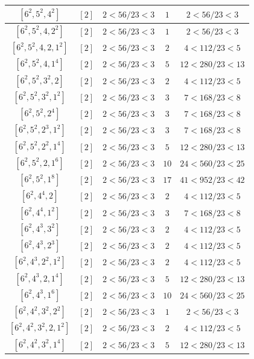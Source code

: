 \documentclass{article}%
\begin{document}
\begin{center}
\begin{longtable}{||c|c|c|c|c||}
$[6^{2}, 5^{2}, 4^{2}]$ & $[2]$ & $2 < 56/23 < 3$ & $1$ & $2 < 56/23 < 3$ \\ \hline 
$[6^{2}, 5^{2}, 4, 2^{2}]$ & $[2]$ & $2 < 56/23 < 3$ & $1$ & $2 < 56/23 < 3$ \\ \hline 
$[6^{2}, 5^{2}, 4, 2, 1^{2}]$ & $[2]$ & $2 < 56/23 < 3$ & $2$ & $4 < 112/23 < 5$ \\ \hline 
$[6^{2}, 5^{2}, 4, 1^{4}]$ & $[2]$ & $2 < 56/23 < 3$ & $5$ & $12 < 280/23 < 13$ \\ \hline 
$[6^{2}, 5^{2}, 3^{2}, 2]$ & $[2]$ & $2 < 56/23 < 3$ & $2$ & $4 < 112/23 < 5$ \\ \hline 
$[6^{2}, 5^{2}, 3^{2}, 1^{2}]$ & $[2]$ & $2 < 56/23 < 3$ & $3$ & $7 < 168/23 < 8$ \\ \hline 
$[6^{2}, 5^{2}, 2^{4}]$ & $[2]$ & $2 < 56/23 < 3$ & $3$ & $7 < 168/23 < 8$ \\ \hline 
$[6^{2}, 5^{2}, 2^{3}, 1^{2}]$ & $[2]$ & $2 < 56/23 < 3$ & $3$ & $7 < 168/23 < 8$ \\ \hline 
$[6^{2}, 5^{2}, 2^{2}, 1^{4}]$ & $[2]$ & $2 < 56/23 < 3$ & $5$ & $12 < 280/23 < 13$ \\ \hline 
$[6^{2}, 5^{2}, 2, 1^{6}]$ & $[2]$ & $2 < 56/23 < 3$ & $10$ & $24 < 560/23 < 25$ \\ \hline 
$[6^{2}, 5^{2}, 1^{8}]$ & $[2]$ & $2 < 56/23 < 3$ & $17$ & $41 < 952/23 < 42$ \\ \hline 
$[6^{2}, 4^{4}, 2]$ & $[2]$ & $2 < 56/23 < 3$ & $2$ & $4 < 112/23 < 5$ \\ \hline 
$[6^{2}, 4^{4}, 1^{2}]$ & $[2]$ & $2 < 56/23 < 3$ & $3$ & $7 < 168/23 < 8$ \\ \hline 
$[6^{2}, 4^{3}, 3^{2}]$ & $[2]$ & $2 < 56/23 < 3$ & $2$ & $4 < 112/23 < 5$ \\ \hline 
$[6^{2}, 4^{3}, 2^{3}]$ & $[2]$ & $2 < 56/23 < 3$ & $2$ & $4 < 112/23 < 5$ \\ \hline 
$[6^{2}, 4^{3}, 2^{2}, 1^{2}]$ & $[2]$ & $2 < 56/23 < 3$ & $2$ & $4 < 112/23 < 5$ \\ \hline 
$[6^{2}, 4^{3}, 2, 1^{4}]$ & $[2]$ & $2 < 56/23 < 3$ & $5$ & $12 < 280/23 < 13$ \\ \hline 
$[6^{2}, 4^{3}, 1^{6}]$ & $[2]$ & $2 < 56/23 < 3$ & $10$ & $24 < 560/23 < 25$ \\ \hline 
$[6^{2}, 4^{2}, 3^{2}, 2^{2}]$ & $[2]$ & $2 < 56/23 < 3$ & $1$ & $2 < 56/23 < 3$ \\ \hline 
$[6^{2}, 4^{2}, 3^{2}, 2, 1^{2}]$ & $[2]$ & $2 < 56/23 < 3$ & $2$ & $4 < 112/23 < 5$ \\ \hline 
$[6^{2}, 4^{2}, 3^{2}, 1^{4}]$ & $[2]$ & $2 < 56/23 < 3$ & $5$ & $12 < 280/23 < 13$ \\ \hline 

\end{longtable}
\end{center}
\end{document}
